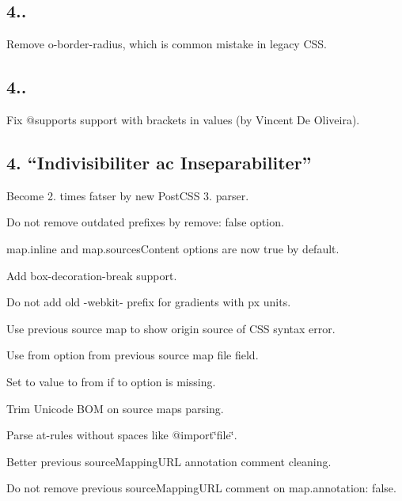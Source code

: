 \subsection*{4..}


\begin{DoxyItemize}
\item Remove {\ttfamily o-\/border-\/radius}, which is common mistake in legacy C\+SS.
\end{DoxyItemize}

\subsection*{4..}


\begin{DoxyItemize}
\item Fix {\ttfamily @supports} support with brackets in values (by Vincent De Oliveira).
\end{DoxyItemize}

\subsection*{4. “\+Indivisibiliter ac Inseparabiliter”}


\begin{DoxyItemize}
\item Become 2. times fatser by new Post\+C\+SS 3. parser.
\item Do not remove outdated prefixes by {\ttfamily remove\+: false} option.
\item {\ttfamily map.\+inline} and {\ttfamily map.\+sources\+Content} options are now {\ttfamily true} by default.
\item Add {\ttfamily box-\/decoration-\/break} support.
\item Do not add old {\ttfamily -\/webkit-\/} prefix for gradients with {\ttfamily px} units.
\item Use previous source map to show origin source of C\+SS syntax error.
\item Use {\ttfamily from} option from previous source map {\ttfamily file} field.
\item Set {\ttfamily to} value to {\ttfamily from} if {\ttfamily to} option is missing.
\item Trim Unicode B\+OM on source maps parsing.
\item Parse at-\/rules without spaces like {\ttfamily @import\char`\"{}file\char`\"{}}.
\item Better previous {\ttfamily source\+Mapping\+U\+RL} annotation comment cleaning.
\item Do not remove previous {\ttfamily source\+Mapping\+U\+RL} comment on {\ttfamily map.\+annotation\+: false}.
\end{DoxyItemize}

